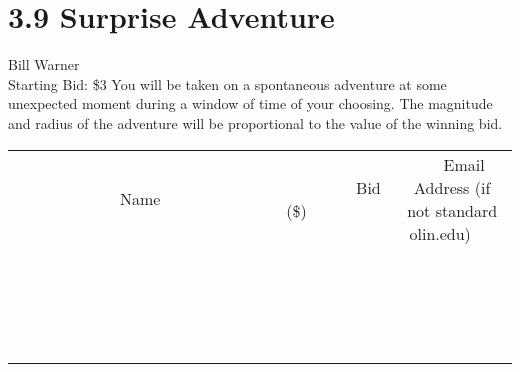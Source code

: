 \documentclass[11pt]{article}
\begin{document}
\section*{3.9 Surprise Adventure}
Bill Warner
\\
Starting Bid: \$3
\newline
You will be taken on a spontaneous adventure at some unexpected moment during a window of time of your choosing. The magnitude and radius of the adventure will be proportional to the value of the winning bid.
\\[3ex]
\begin{tabular}{c c c}
~~~~~~~~~~~~~Name~~~~~~~~~~~~~ & ~~~~~~~~~Bid (\$)~~~~~~~~~  & ~~~Email Address (if not standard olin.edu)~~~\\
 & & \\
\hline
 & & \\
\hline
 & & \\
\hline
 & & \\
\hline
 & & \\
\hline
 & & \\
\hline
 & & \\
\hline
 & & \\
\hline
 & & \\
\hline
 & & \\
\hline
 & & \\
\hline
 & & \\
\hline
 & & \\
\hline
 & & \\
\hline
 & & \\
\hline
 & & \\
\hline
 & & \\
\hline
 & & \\
\hline
 & & \\
\hline
\end{tabular}
\newpage
\end{document}
